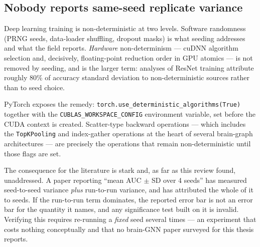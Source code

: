 \subsection{Nobody reports same-seed replicate variance}
\label{sec:gap-determinism}

Deep learning training is non-deterministic at two levels. Software randomness (PRNG seeds,
data-loader shuffling, dropout masks) is what seeding addresses and what the field reports.
\emph{Hardware} non-determinism --- cuDNN algorithm selection and, decisively,
floating-point reduction order in GPU atomics --- is not removed by seeding, and is the
larger term: analyses of ResNet training attribute roughly 80\% of accuracy standard
deviation to non-deterministic sources rather than to seed choice.

PyTorch exposes the remedy: \texttt{torch.use\_deterministic\_algorithms(True)} together
with the \texttt{CUBLAS\_WORKSPACE\_CONFIG} environment variable, set before the CUDA
context is created. Scatter-type backward operations --- which includes the
\texttt{TopKPooling} and index-gather operations at the heart of several brain-graph
architectures --- are precisely the operations that remain non-deterministic until those
flags are set.

The consequence for the literature is stark and, as far as this review found,
unaddressed. A paper reporting ``mean AUC $\pm$ SD over 4 seeds'' has measured
seed-to-seed variance \emph{plus} run-to-run variance, and has attributed the whole of it
to seeds. If the run-to-run term dominates, the reported error bar is not an error bar for
the quantity it names, and any significance test built on it is invalid. Verifying this
requires re-running a \emph{fixed} seed several times --- an experiment that costs nothing
conceptually and that no brain-GNN paper surveyed for this thesis reports.



